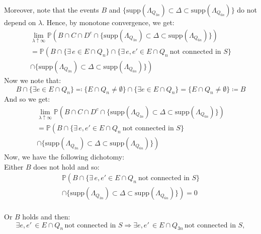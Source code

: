 \documentclass[10pt,a4paper]{amsart}
\theoremstyle{exampstyle}
\theoremstyle{exampnotations}
\begin{document}
Moreover, note that the events $B$ and $\Big\lbrace \text{supp}(\Lambda_{Q_{3n}}) \subset \Delta \subset \text{supp}(\Lambda_{Q_{6n}}) \Big\rbrace$ do not depend on $\lambda$. Hence, by monotone convergence, we get:
\begin{gather*}
    \lim_{\lambda \uparrow \infty} \mathbb{P}\left(B \cap C \cap D^c  \cap \Big\lbrace \text{supp}(\Lambda_{Q_{3n}}) \subset \Delta \subset \text{supp}(\Lambda_{Q_{6n}}) \Big\rbrace \right) 
    \\ = \mathbb{P}\left(B \cap \Big\lbrace \exists \, e \in E \cap Q_n \Big\rbrace \cap \Big\lbrace \exists \, e,e' \in E\cap Q_n \: \text{not connected in } S  \Big\rbrace \right. \\ \left. \cap \Big\lbrace \text{supp}(\Lambda_{Q_{3n}}) \subset \Delta \subset \text{supp}(\Lambda_{Q_{6n}}) \Big\rbrace  \right)
\end{gather*}
Now we note that:
\begin{equation*}
    B \cap \lbrace \exists e \in E \cap Q_n \rbrace \eqqcolon \lbrace E \cap Q_n \neq \emptyset \rbrace \cap \lbrace \exists e \in E \cap Q_n \rbrace = \lbrace E \cap Q_n \neq \emptyset \rbrace \coloneqq B
\end{equation*}
And so we get:
\begin{gather*}
    \lim_{\lambda \uparrow \infty} \mathbb{P}\left(B \cap C \cap D^c  \cap \Big\lbrace \text{supp}(\Lambda_{Q_{3n}}) \subset \Delta \subset \text{supp}(\Lambda_{Q_{6n}}) \Big\rbrace \right) 
    \\ = \mathbb{P}\left(B  \cap \Big\lbrace \exists \, e,e' \in E\cap Q_n \: \text{not connected in } S  \Big\rbrace \right. \\ \left. \cap \Big\lbrace \text{supp}(\Lambda_{Q_{3n}}) \subset \Delta \subset \text{supp}(\Lambda_{Q_{6n}}) \Big\rbrace  \right)
\end{gather*}
Now, we have the following dichotomy: \\
Either $B$ does not hold and so:
\begin{gather*}
    \mathbb{P}\left(B  \cap \Big\lbrace \exists \, e,e' \in E\cap Q_n \: \text{not connected in } S  \Big\rbrace \right. \\ \left. \cap \Big\lbrace \text{supp}(\Lambda_{Q_{3n}}) \subset \Delta \subset \text{supp}(\Lambda_{Q_{6n}}) \Big\rbrace  \right) = 0
\end{gather*} \\
Or $B$ holds and then: 
\begin{equation*}
    \exists e,e' \, \in E \cap Q_n \, \text{not connected in } S \Rightarrow \exists e,e' \, \in E \cap Q_{3n} \, \text{not connected in } S,
\end{equation*}
\end{document}
